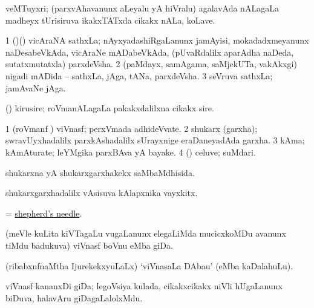 \bentry
{} 
\gl{\nA}
\bmng
 veMTuyxri; (parxvAhavanunx aLeyalu yA hiVralu) agalavAda nALagaLa madheyx tUrisiruva ikakxTATxda cikakx nALa, koLave. 
\emng
\eentry

\bentry
{} 
\gl{\nA}
\expl{}
\bmng
\bnum
\num{1} (\nAyxshA)(\ca) vicAraNA sathxLa; nAyxyadashiRgaLanunx jamAyisi, mokadadxmeyanunx naDesabeVkAda, vicAraNe mADabeVkAda, (pUvaRdalilx aparAdha naDeda, sutatxmutatxla) parxdeVsha. 
\num{2} (paMdayx, samAgama, saMjekUTa, \mo vakAkxgi) nigadi mADida -- sathxLa, jAga, tANa, parxdeVsha. 
\num{3} seVruva sathxLa; jamAvaNe jAga. 
\enum
\emng
\eentry

\bentry
{} 
\gl{\nA}
\expl{}
\bmng
 (\aMrashA) kirusire; roVmanALagaLa pakakxdalilxna cikakx sire. 
\emng
\eentry

\bentry
{} 
\gl{\nA}
\bmng
\bnum
\num{1} (roVmanf \pu) viVnasf; perxVmada adhideVvate. 
\num{2} shukarx (garxha); swravUyxhadalilx parxkAshadalilx sUrayxnige eraDaneyadAda garxha. 
\num{3} kAma; kAmAturate; leYMgika parxBAva yA bayake. 
\num{4} (\kAparx) celuve; suMdari. 
\enum
\emng
\eentry

\bentry
{} 
\gl{\gu}
\expl{}
\bmng
 shukarxna yA shukarxgarxhakekx saMbaMdhisida. 
\emng
\eentry

\bentry
{} 
\gl{\nA}
\expl{}
\bmng
 shukarxgarxhadalilx vAsisuva kAlapxnika vayxkitx. 
\emng
\eentry

\bentry
{} 
\gl{\nA}
\expl{}
\bmng
 = \hyperref{kandict_s.pdf}{S}{shepherd's needle}{shepherd's needle}. 
\emng
\eentry

\bentry
{}
\gl{\nA}
\bmng
 (meVle kuLita kiVTagaLu \mo vugaLanunx elegaLiMda mucicxkoMDu avanunx tiMdu badukuva) viVnasf boVnu eMba giDa.  
\emng
\eentry

\bentry
{}
\gl{\nA}
\expl{}
\bmng
 (ribabxnfnaMtha IjurekekxyuLaLx) `viVnasaLa DAbau' (eMba kaDalahuLu). 
\emng
\eentry

\bentry
{}
\gl{\nA}
\expl{}
\bmng
 viVnasf kananxDi giDa; legoVsiya kulada, cikakxcikakx niVli hUgaLanunx biDuva, halavAru giDagaLalolxMdu. 
\emng
\eentry

